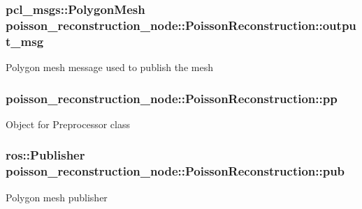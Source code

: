 \subsubsection[{\texorpdfstring{output\+\_\+msg}{output_msg}}]{\setlength{\rightskip}{0pt plus 5cm}pcl\+\_\+msgs\+::\+Polygon\+Mesh poisson\+\_\+reconstruction\+\_\+node\+::\+Poisson\+Reconstruction\+::output\+\_\+msg\hspace{0.3cm}{\ttfamily [private]}}\hypertarget{classpoisson__reconstruction__node_1_1_poisson_reconstruction_aa96805cee822cdeada23ed2dd3d70ac9}{}\label{classpoisson__reconstruction__node_1_1_poisson_reconstruction_aa96805cee822cdeada23ed2dd3d70ac9}
Polygon mesh message used to publish the mesh 
\subsubsection[{\texorpdfstring{pp}{pp}}]{ poisson\+\_\+reconstruction\+\_\+node\+::\+Poisson\+Reconstruction\+::pp\hspace{0.3cm}{\ttfamily [private]}}\hypertarget{classpoisson__reconstruction__node_1_1_poisson_reconstruction_a0fd4f45342a06eeb16e43d50a85fb0eb}{}\label{classpoisson__reconstruction__node_1_1_poisson_reconstruction_a0fd4f45342a06eeb16e43d50a85fb0eb}
Object for Preprocessor class 
\subsubsection[{\texorpdfstring{pub}{pub}}]{\setlength{\rightskip}{0pt plus 5cm}ros\+::\+Publisher poisson\+\_\+reconstruction\+\_\+node\+::\+Poisson\+Reconstruction\+::pub\hspace{0.3cm}{\ttfamily [private]}}\hypertarget{classpoisson__reconstruction__node_1_1_poisson_reconstruction_ae771ab3e291d8ae32216a644ef8aa26d}{}\label{classpoisson__reconstruction__node_1_1_poisson_reconstruction_ae771ab3e291d8ae32216a644ef8aa26d}
Polygon mesh publisher 
